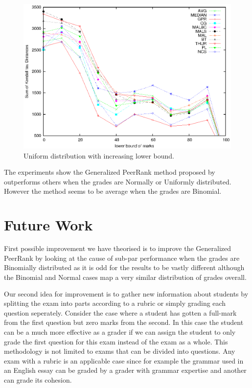 \documentclass[a4paper]{article}
\begin{document}
\begin{figure}[H]
\centering
\includegraphics[width=1\textwidth]{figure3}
\caption{Uniform distribution with increasing lower bound.}
\end{figure}
\clearpage
 
The experiments show the Generalized PeerRank method proposed by \cite{Walsh14a} outperforms
others when the grades are Normally or Uniformly distributed. However the method seems to be
average when the grades are Binomial. 

\section{Future Work}
First possible improvement we have theorised is to improve the Generalized PeerRank by looking
at the cause of sub-par performance when the grades are Binomially distributed as it is odd for
the results to be vastly different although the Binomial and Normal cases map a very similar
distribution of grades overall.

Our second idea for improvement is to gather new information about students by splitting the
exam into parts according to a rubric or simply grading each question seperately. Consider the
case where a student has gotten a full-mark from the first question but zero marks from the
second. In this case the student can be a much more effective as a grader if we can assign the
student to only grade the first question for this exam instead of the exam as a whole. This
methodology is not limited to exams that can be divided into questions. Any exam with a rubric
is an applicable case since for example the grammar used in an English essay can be graded by
a grader with grammar expertise and another can grade its cohesion.
\end{document}
